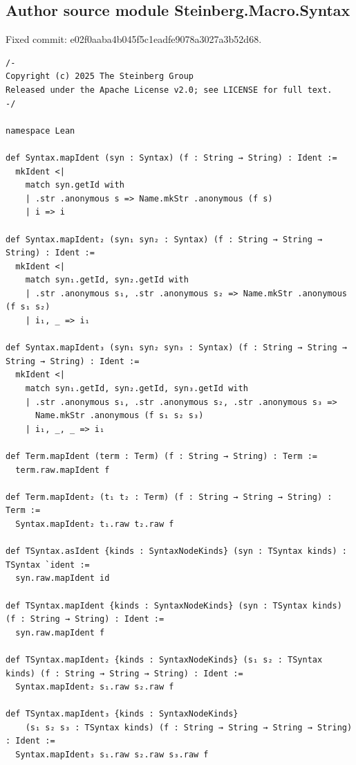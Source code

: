 \documentclass[10pt,a4paper]{article}
\begin{document}
\subsection*{Author source module Steinberg.Macro.Syntax}
\noindent Fixed commit: e02f0aaba4b045f5c1eadfe9078a3027a3b52d68.
\begin{Verbatim}
/-
Copyright (c) 2025 The Steinberg Group
Released under the Apache License v2.0; see LICENSE for full text.
-/

namespace Lean

def Syntax.mapIdent (syn : Syntax) (f : String → String) : Ident :=
  mkIdent <|
    match syn.getId with
    | .str .anonymous s => Name.mkStr .anonymous (f s)
    | i => i

def Syntax.mapIdent₂ (syn₁ syn₂ : Syntax) (f : String → String → String) : Ident :=
  mkIdent <|
    match syn₁.getId, syn₂.getId with
    | .str .anonymous s₁, .str .anonymous s₂ => Name.mkStr .anonymous (f s₁ s₂)
    | i₁, _ => i₁

def Syntax.mapIdent₃ (syn₁ syn₂ syn₃ : Syntax) (f : String → String → String → String) : Ident :=
  mkIdent <|
    match syn₁.getId, syn₂.getId, syn₃.getId with
    | .str .anonymous s₁, .str .anonymous s₂, .str .anonymous s₃ =>
      Name.mkStr .anonymous (f s₁ s₂ s₃)
    | i₁, _, _ => i₁

def Term.mapIdent (term : Term) (f : String → String) : Term :=
  term.raw.mapIdent f

def Term.mapIdent₂ (t₁ t₂ : Term) (f : String → String → String) : Term :=
  Syntax.mapIdent₂ t₁.raw t₂.raw f

def TSyntax.asIdent {kinds : SyntaxNodeKinds} (syn : TSyntax kinds) : TSyntax `ident :=
  syn.raw.mapIdent id

def TSyntax.mapIdent {kinds : SyntaxNodeKinds} (syn : TSyntax kinds) (f : String → String) : Ident :=
  syn.raw.mapIdent f

def TSyntax.mapIdent₂ {kinds : SyntaxNodeKinds} (s₁ s₂ : TSyntax kinds) (f : String → String → String) : Ident :=
  Syntax.mapIdent₂ s₁.raw s₂.raw f

def TSyntax.mapIdent₃ {kinds : SyntaxNodeKinds}
    (s₁ s₂ s₃ : TSyntax kinds) (f : String → String → String → String) : Ident :=
  Syntax.mapIdent₃ s₁.raw s₂.raw s₃.raw f
\end{Verbatim}
\end{document}
